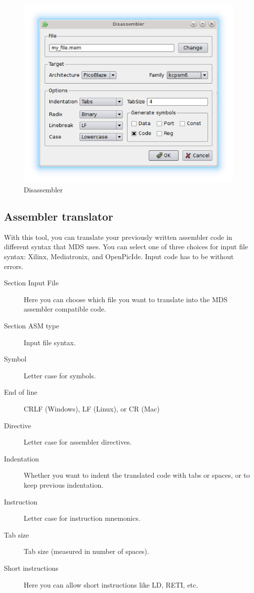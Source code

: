         \begin{figure}[h]
            \centering
            \includegraphics[width=.5\textwidth]{img/disassembler_window.png}
            \caption{Disassembler}
        \end{figure}

    \clearpage
    \subsection{Assembler translator}
        With this tool, you can translate your previously written assembler code in different syntax that MDS uses. You can select one of three choices for input file syntax: Xilinx, Mediatronix, and OpenPicIde. Input code has to be without errors.

        \begin{description}
            \item[Section Input File] Here you can choose which file you want to translate into the MDS assembler compatible code.
            \item[Section ASM type] Input file syntax.
            \item[Symbol] Letter case for symbols.
            \item[End of line] CRLF (Windows), LF (Linux), or CR (Mac)
            \item[Directive] Letter case for assembler directives.
            \item[Indentation] Whether you want to indent the translated code with tabs or spaces, or to keep previous indentation.
            \item[Instruction] Letter case for instruction mnemonics.
            \item[Tab size] Tab size (measured in number of spaces).
            \item[Short instructions] Here you can allow short instructions like LD, RETI, etc.
        \end{description}

